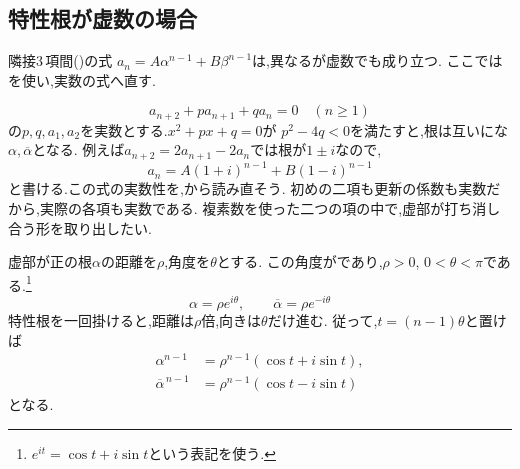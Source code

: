 \subsection{特性根が虚数の場合}\label{節：特性根が虚数の場合}

隣接3\,項間()の式
$a_n=A\alpha^{n-1}+B\beta^{n-1}$は,異なるが虚数でも成り立つ.
ここではを使い,実数の式へ直す.

\[
  a_{n+2}+pa_{n+1}+qa_n=0\quad(n\ge1)
\]
の$p,q,a_1,a_2$を実数とする.$x^2+px+q=0$が
$p^2-4q<0$を満たすと,根は互いにな$\alpha,\overline\alpha$となる.
例えば$a_{n+2}=2a_{n+1}-2a_n$では根が$1\pm i$なので,
\[
  a_n=A(1+i)^{n-1}+B(1-i)^{n-1}
\]
と書ける.この式の実数性を,から読み直そう.
初めの二項も更新の係数も実数だから,実際の各項も実数である.
複素数を使った二つの項の中で,虚部が打ち消し合う形を取り出したい.

虚部が正の根$\alpha$の距離を$\rho$,角度を$\theta$とする.
この角度がであり,$\rho>0$, $0<\theta<\pi$である.\footnote{$e^{it}=\cos t+i\sin t$という表記を使う.}
\[
  \alpha=\rho e^{i\theta},\qquad
  \overline\alpha=\rho e^{-i\theta}
\]
特性根を一回掛けると,距離は$\rho$倍,向きは$\theta$だけ進む.
従って,$t=(n-1)\theta$と置けば
\[
  \begin{aligned}
    \alpha^{n-1}&=\rho^{n-1}(\cos t+i\sin t),\\
    \overline\alpha^{\,n-1}&=\rho^{n-1}(\cos t-i\sin t)
  \end{aligned}
\]
となる.
\BookFigComplexRoots

